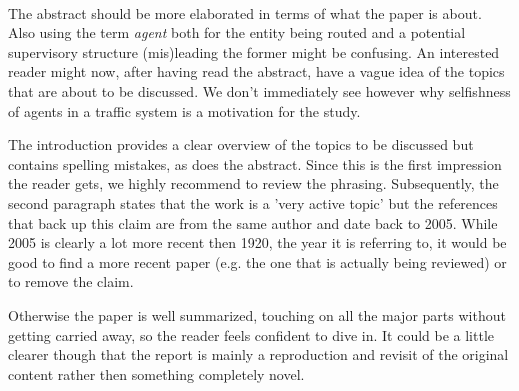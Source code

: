 \documentclass[../review.tex]{subfiles}
\begin{document}
\\
The abstract should be more elaborated in terms of what the paper is about. Also using the term \textit{agent} both for the entity being routed and a potential supervisory structure (mis)leading the former might be confusing. An interested reader might now, after having read the abstract, have a vague idea of the topics that are about to be discussed. We don't immediately see however why selfishness of agents in a traffic system is a motivation for the study.

The introduction provides a clear overview of the topics to be discussed but contains spelling mistakes, as does the abstract. Since this is the first impression the reader gets, we highly recommend to review the phrasing. Subsequently, the second paragraph states that the work is a 'very active topic' but the references that back up this claim are from the same author and date back to 2005. While 2005 is clearly a lot more recent then 1920, the year it is referring to, it would be good to find a more recent paper (e.g. the one that is actually being reviewed) or to remove the claim.

Otherwise the paper is well summarized, touching on all the major parts without getting carried away, so the reader feels confident to dive in. It could be a little clearer though that the report is mainly a reproduction and revisit of the original content rather then something completely novel.
\end{document}
